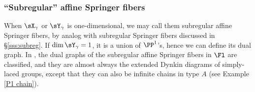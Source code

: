\subsubsection{``Subregular'' affine Springer fibers}
When $\sX_{\gamma}$ or $\sY_{\gamma}$ is one-dimensional, we may call them subregular affine Springer fibers, by analog with subregular Springer fibers discussed in \S\ref{sss:subreg}. If $\dim\sY_{\gamma}=1$, it is a union of $\PP^{1}$'s, hence we can define its dual graph. In \cite[Prop 7.7]{KL}, the dual graphs of the subregular affine Springer fibers in $\Fl$ are classified, and they are almost always the extended Dynkin diagrams of simply-laced groups, except that they can also be infinite chains in type $A$ (see Example \ref{P1 chain}). 



